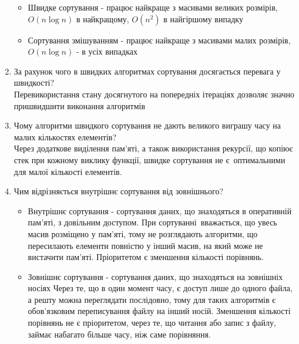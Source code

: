 \begin{enumerate}
          \begin{itemize}
              \item Швидке сортування - працює найкраще з масивами великих розмірів,
                    $O (n \log n)$ в найкращому, $O (n^2)$ в найгіршому випадку
              \item Сортування змішуванням - працює найкраще з масивами малих розмірів,
                    $O (n \log n)$ - в усіх випадках
          \end{itemize}
    \item За рахунок чого в швидких алгоритмах сортування досягається перевага у швидкості? \\
          Перевикористання стану досягнутого на попередніх ітераціях дозволяє значно
          пришвидшити виконання алгоритмів
    \item Чому алгоритми швидкого сортування не дають великого виграшу часу на малих кількостях елементів? \\
          Через додаткове виділення пам'яті, а також використання рекурсії, що копіює стек
          при кожному виклику функції, швидке сортування не є оптимальними
          для малої кількості елементів.
    \item Чим відрізняється внутрішнє сортування від зовнішнього?
          \begin{itemize}
              \item Внутрішнє сортування - сортування даних, що знаходяться в оперативній пам'яті,
                    з довільним доступом. При сортуванні вважається, що увесь масив розміщено
                    у пам'яті, тому не розглядають алгоритми, що пересилають елементи повністю
                    у інший масив, на який може не вистачити пам'яті. Пріоритетом є зменшення
                    кількості порівнянь.
              \item Зовнішнє сортування - сортування даних, що знаходяться на зовнішніх носіях
                    Через те, що в один момент часу, є доступ лише до одного файла,
                    а решту можна переглядати послідовно, тому для таких алгоритмів
                    є обов'язковим переписування файлу на інший носій. Зменшення кількості
                    порівнянь не є пріоритетом, через те, що читання або запис з файлу,
                    займає набагато більше часу, ніж саме порівняння.
          \end{itemize}
\end{enumerate}
